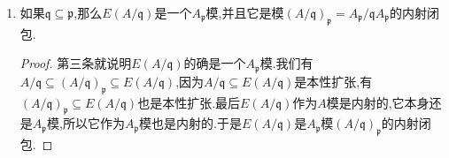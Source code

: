 \begin{enumerate}
\begin{proof}
    	我们先断言有$\mathrm{Ass}(E(A/\mathfrak{p}))=\{\mathfrak{p}\}$.一方面因为$E(A/\mathfrak{p})$是$A/\mathfrak{p}$的本性扩张,至少有单射$A/\mathfrak{p}\to E(A/\mathfrak{p})$,所以$\mathfrak{p}\in\mathrm{Ass}(E(A/\mathfrak{p}))$.另外倘若有单射$\mathfrak{q}\to E(A/\mathfrak{p})$,按照第二条一样可证明$E(A/\mathfrak{q})\cong E(A/\mathfrak{p})$,迫使$\mathfrak{p}=\mathfrak{q}$.证明了断言.于是子模$A\xi\subseteq E(A/\mathfrak{p})$仍然以$\mathfrak{p}$为唯一的伴随素理想,所以$\mathrm{Ann}(\xi)$是$\mathfrak{p}$准素的.诺特条件就导致有$\mathfrak{p}^v\xi=0$.
    \end{proof}
    \item 如果$\mathfrak{q}\subseteq\mathfrak{p}$,那么$E(A/\mathfrak{q})$是一个$A_{\mathfrak{p}}$模,并且它是模$(A/\mathfrak{q})_{\mathfrak{p}}=A_{\mathfrak{p}}/\mathfrak{q}A_{\mathfrak{p}}$的内射闭包.
    \begin{proof}
    	
    	第三条就说明$E(A/\mathfrak{q})$的确是一个$A_{\mathfrak{p}}$模.我们有$A/\mathfrak{q}\subseteq(A/\mathfrak{q})_{\mathfrak{p}}\subseteq E(A/\mathfrak{q})$,因为$A/\mathfrak{q}\subseteq E(A/\mathfrak{q})$是本性扩张,有$(A/\mathfrak{q})_{\mathfrak{p}}\subseteq E(A/\mathfrak{q})$也是本性扩张.最后$E(A/\mathfrak{q})$作为$A$模是内射的,它本身还是$A_{\mathfrak{p}}$模,所以它作为$A_{\mathfrak{p}}$模也是内射的.于是$E(A/\mathfrak{q})$是$A_{\mathfrak{p}}$模$(A/\mathfrak{q})_{\mathfrak{p}}$的内射闭包.
    \end{proof}
\end{enumerate}

